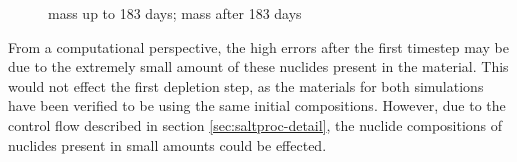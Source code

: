 \begin{figure}[htpb]
    \centering
    \caption{}
    \caption[ mass]{
      mass up to 183 days;
      mass after 183 days}
    \label{fig:cm246-mass}
\end{figure}


From a computational perspective, the high errors after the first timestep may
be due to the extremely small amount of these nuclides present in the material.
This would not effect the first depletion step, as the materials for both
simulations have been verified to be using the same initial compositions.
However, due to the control flow described in section
\ref{sec:saltproc-detail}, the nuclide compositions of nuclides present in
small amounts could be effected.

